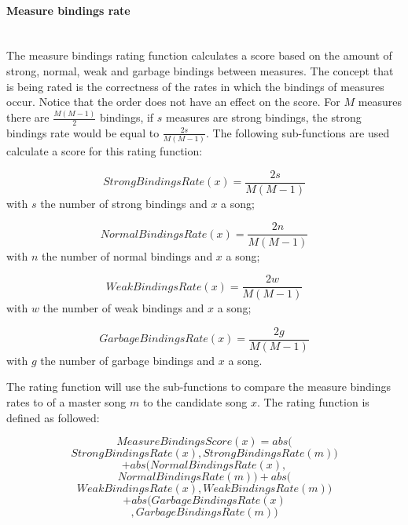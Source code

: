 \paragraph{Measure bindings rate}\mbox{}\\
The measure bindings rating function calculates a score based on the amount of strong, normal, weak and garbage bindings between measures. The concept that is being rated is the correctness of the rates in which the bindings of measures occur. Notice that the order does not have an effect on the score. For $M$ measures there are \( \frac{M  (M-1)}{2} \) bindings, if $s$ measures are strong bindings, the strong bindings rate would be equal to $\frac{2s}{ M  (M-1) }$. The following sub-functions are used calculate a score for this rating function:

\[ StrongBindingsRate(x) = \frac{\textit{2s}}{M  (M-1)} \]
with $s$ the number of strong bindings and $x$ a song;

\[ NormalBindingsRate(x) = \frac{\textit{2n}}{M  (M-1)} \]
with $n$ the number of normal bindings and $x$ a song;

\[ WeakBindingsRate(x) = \frac{\textit{2w}}{M (M-1)}   \]
with $w$ the number of weak bindings and $x$ a song;

\[ GarbageBindingsRate(x) = \frac{\textit{2g}}{M (M-1)} \]
with $g$ the number of garbage bindings and $x$ a song.

The rating function will use the sub-functions to compare the measure bindings rates to of a master song $m$ to the candidate song $x$. The rating function is defined as followed:

\[MeasureBindingsScore(x) = abs( \]
\[StrongBindingsRate(x), StrongBindingsRate(m))\]
\[+ abs( NormalBindingsRate(x), \]
\[NormalBindingsRate(m))+ abs(  \]
\[WeakBindingsRate(x) , WeakBindingsRate(m)) \]
\[+ abs( GarbageBindingsRate(x) \]
\[, GarbageBindingsRate(m)) \]

